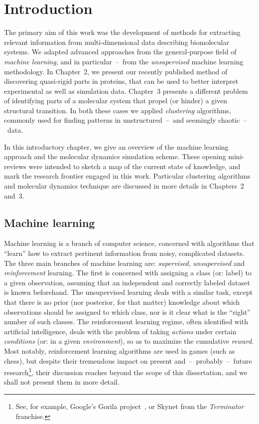 \documentclass[a4paper,11pt,twoside]{book}%
\begin{document}
 



%

\tableofcontents

\chapter{Introduction}

The primary aim of this work was the development of methods for extracting relevant information from multi-dimensional data describing biomolecular systems.
We adapted advanced approaches from the general-purpose field of \emph{machine learning}, and in particular~--~from the \emph{unsupervised} machine learning methodology.
In Chapter~2, we present our recently published method of discovering quasi-rigid parts in proteins, that can be used to better interpret experimental as well as simulation data.
Chapter~3 presents a different problem of identifying parts of a molecular system that propel (or hinder) a given structural transition.
In both these cases we applied \emph{clustering} algorithms, commonly used for finding patterns in unstructured~--~and seemingly chaotic~--~data.

In this introductory chapter, we give an overview of the machine learning approach and the molecular dynamics simulation scheme.
These opening mini-reviews were intended to sketch a map of the current state of knowledge, and mark the research frontier engaged in this work.
Particular clustering algorithms and molecular dynamics technique are discussed in more details in Chapters~2 and~3.

\section{Machine learning}

Machine learning is a branch of computer science, concerned with algorithms that ``learn'' how to extract pertinent information from noisy, complicated datasets.
The three main branches of machine learning are: \emph{supervised}, \emph{unsupervised} and \emph{reinforcement} learning.
The first is concerned with assigning a class (or: label) to a given observation, assuming that an independent and correctly labeled dataset is known beforehand.
The unsupervised learning deals with a similar task, except that there is no prior (nor posterior, for that matter) knowledge about which observations should be assigned to which class, nor is it clear what is the ``right'' number of such classes.
The reinforcement learning regime, often identified with artificial intelligence, deals with the problem of taking \emph{actions} under certain \emph{conditions} (or: in a given \emph{environment}), so as to maximize the cumulative \emph{reward}. 
Most notably, reinforcement learning algorithms are used in games (such as chess), but despite their tremendous impact on present and~--~probably~--~future research\footnote{See, for example, Google's Gorila project~\cite{nair2015massively}, or Skynet from the \emph{Terminator} franchise.}, their discussion reaches beyond the scope of this dissertation, and we shall not present them in more detail.
\end{document}
